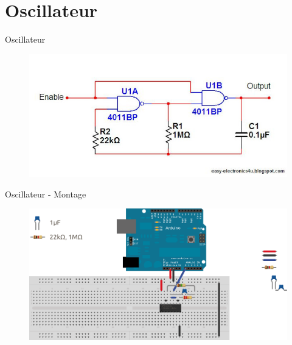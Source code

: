 \documentclass{beamer}
\begin{document}
\section{Oscillateur}
\begin{frame}{Oscillateur}
	\begin{figure}
		\centering
		\includegraphics[width=\textwidth,height=0.9\textheight,keepaspectratio]{oscillator.jpg}
	\end{figure}
\end{frame}

\begin{frame}{Oscillateur - Montage}
	\begin{figure}
		\centering
		\includegraphics[width=\textwidth,height=0.9\textheight,keepaspectratio]{sysdig_clock}
	\end{figure}
\end{frame}
\end{document}
